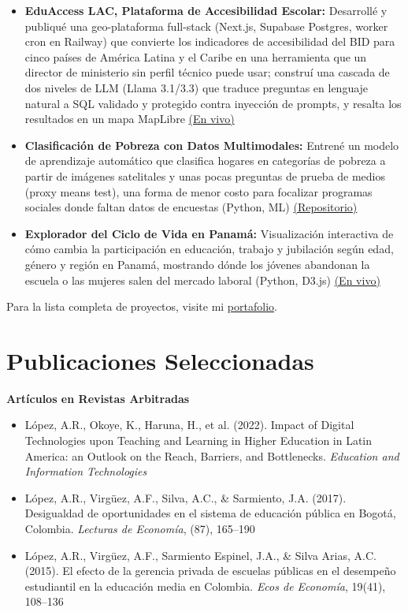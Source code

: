 \documentclass[10pt]{article}
\newenvironment{cvitems}{%
  \begin{itemize}[
    leftmargin=1.2em,
    itemsep=0pt,
    parsep=0pt,
    topsep=1pt,
    label={$\bullet$}]%
}{\end{itemize}}
\begin{document}
\begin{cvitems}
  \item \textbf{EduAccess LAC, Plataforma de Accesibilidad Escolar:} Desarroll\'e y publiqu\'e una geo-plataforma full-stack (Next.js, Supabase Postgres, worker cron en Railway) que convierte los indicadores de accesibilidad del BID para cinco pa\'ises de Am\'erica Latina y el Caribe en una herramienta que un director de ministerio sin perfil t\'ecnico puede usar; constru\'i una cascada de dos niveles de LLM (Llama 3.1/3.3) que traduce preguntas en lenguaje natural a SQL validado y protegido contra inyecci\'on de prompts, y resalta los resultados en un mapa MapLibre \href{https://eduaccess-lac.vercel.app/}{(En vivo)}
  \item \textbf{Clasificaci\'on de Pobreza con Datos Multimodales:} Entren\'e un modelo de aprendizaje autom\'atico que clasifica hogares en categor\'ias de pobreza a partir de im\'agenes satelitales y unas pocas preguntas de prueba de medios (proxy means test), una forma de menor costo para focalizar programas sociales donde faltan datos de encuestas (Python, ML) \href{https://github.com/uchicago-capp30254-spr-25/project-alopezsanchez-cnunezh-jmcarias}{(Repositorio)}
  \item \textbf{Explorador del Ciclo de Vida en Panam\'a:} Visualizaci\'on interactiva de c\'omo cambia la participaci\'on en educaci\'on, trabajo y jubilaci\'on seg\'un edad, g\'enero y regi\'on en Panam\'a, mostrando d\'onde los j\'ovenes abandonan la escuela o las mujeres salen del mercado laboral (Python, D3.js) \href{https://angelalop.github.io/capp30239_interactive_viz/}{(En vivo)}
\end{cvitems}

\vspace{2pt}
Para la lista completa de proyectos, visite mi \href{https://angelalop.github.io/AngelaLopezS/}{portafolio}.

\section{Publicaciones Seleccionadas}

\textbf{Art\'iculos en Revistas Arbitradas}
\begin{cvitems}
  \item L\'opez, A.R., Okoye, K., Haruna, H., et al. (2022). Impact of Digital Technologies upon Teaching and Learning in Higher Education in Latin America: an Outlook on the Reach, Barriers, and Bottlenecks. \textit{Education and Information Technologies}
  \item L\'opez, A.R., Virg\"uez, A.F., Silva, A.C., \& Sarmiento, J.A. (2017). Desigualdad de oportunidades en el sistema de educaci\'on p\'ublica en Bogot\'a, Colombia. \textit{Lecturas de Econom\'ia}, (87), 165--190
  \item L\'opez, A.R., Virg\"uez, A.F., Sarmiento Espinel, J.A., \& Silva Arias, A.C. (2015). El efecto de la gerencia privada de escuelas p\'ublicas en el desempe\~no estudiantil en la educaci\'on media en Colombia. \textit{Ecos de Econom\'ia}, 19(41), 108--136
\end{cvitems}
\end{document}
